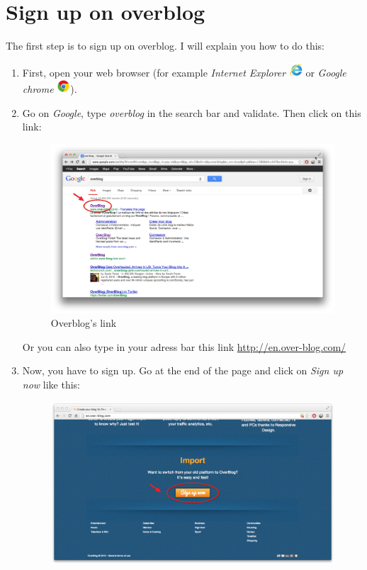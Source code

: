 \documentclass[a4paper,10pt]{article}
\begin{document}
\section{Sign up on overblog}
The first step is to sign up on overblog. I will explain you how to do this:
\begin{enumerate}
\item First, open your web browser (for example \emph{Internet Explorer} \includegraphics[width=0.5cm]{Images/explorer.png} or \emph{Google chrome} \includegraphics[width=0.5cm]{Images/chrome.png}).
\item Go on \emph{Google}, type \emph{overblog} in the search bar and validate. Then click on this link:
\begin{figure}[H]
    \center
	\includegraphics[width=13cm]{Images/linkOverblog.png}
    \caption{Overblog's link}
\end{figure}
Or you can also type in your adress bar this link \url{http://en.over-blog.com/}
\item Now, you have to sign up. Go at the end of the page and click on \emph{Sign up now} like this:
\begin{figure}[H]
    \center
	\includegraphics[width=13cm]{Images/signUpButton.png}

\end{figure}
\end{enumerate}
\end{document}

